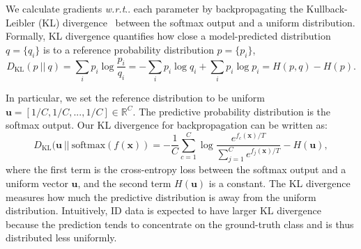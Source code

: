 \documentclass{article}
\makeatletter
\def\*#1{\mathbf{#1}}
\DeclareRobustCommand\onedot{\futurelet\@let@token\@onedot}
\def\@onedot{\ifx\@let@token.\else.\null\fi\xspace}
\def\wrt{\emph{w.r.t}\onedot} \def\dof{d.o.f\onedot}
\makeatother
\begin{document}
We calculate gradients \wrt each parameter by backpropagating the Kullback-Leibler (KL) divergence~\cite{kullback1951information} between the softmax output and a uniform distribution. Formally, KL divergence quantifies how close a model-predicted distribution $q=\{q_i\}$ is to a reference probability distribution $p=\{p_i\}$,
\begin{equation}
    D_\text{KL} (p~||~q) = \sum_i p_i \log \frac{p_i}{q_i} = -\sum_i p_i \log q_i + \sum_i p_i \log p_i  = H(p,q) - H(p).
\end{equation}

In particular, we set the reference distribution to be uniform $\*u= [1/C, 1/C,...,1/C] \in \mathbb{R}^C$. The predictive probability distribution is the softmax output. Our KL divergence for backpropagation can be written as:
\vspace{-0.2cm}
\begin{equation}
\label{eq:kl}
    D_\text{KL}(\*u~||~\text{softmax}(f(\*x))  = - \frac{1}{C}\sum_{c=1}^C \log{ \frac{e^{{f_c(\*x)} / T}}{\sum_{j=1}^C e^{{f_{j}(\*x)} / T}}} - H(\*u),
\end{equation}
where the first term is the cross-entropy loss between the softmax output and a uniform vector $\*u$, and the second term $H(\*u)$ is a constant. The KL divergence measures how much the predictive distribution is away from the uniform distribution. Intuitively, ID data is expected to have larger KL divergence because the prediction tends to concentrate on the ground-truth class and is thus distributed less uniformly. %
\end{document}
